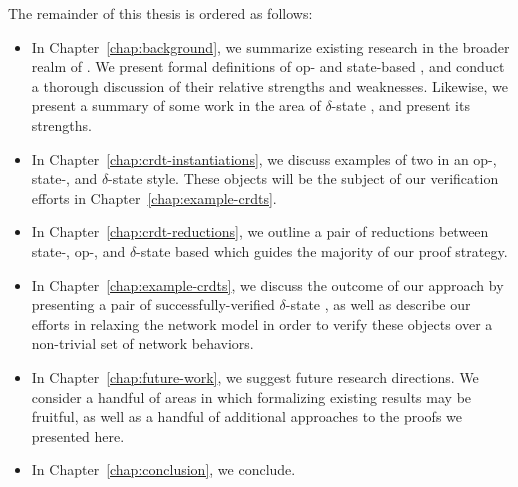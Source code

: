 The remainder of this thesis is ordered as follows:
\begin{itemize}
  \item In Chapter~\ref{chap:background}, we summarize existing research in the
    broader realm of \CRDTs. We present formal definitions of op- and
    state-based \CRDTs, and conduct a thorough discussion of their relative
    strengths and weaknesses. Likewise, we present a summary of some work in the
    area of $\delta$-state \CRDTs, and present its strengths.
  \item In Chapter~\ref{chap:crdt-instantiations}, we discuss examples of two
    \CRDTs in an op-, state-, and $\delta$-state style. These objects will be
    the subject of our verification efforts in Chapter~\ref{chap:example-crdts}.
  \item In Chapter~\ref{chap:crdt-reductions}, we outline a pair of reductions
    between state-, op-, and $\delta$-state based \CRDTs which guides the
    majority of our proof strategy.
  \item In Chapter~\ref{chap:example-crdts}, we discuss the outcome of our
    approach by presenting a pair of successfully-verified $\delta$-state
    \CRDTs, as well as describe our efforts in relaxing the network model in
    order to verify these objects over a non-trivial set of network behaviors.
  \item In Chapter~\ref{chap:future-work}, we suggest future
    research directions. We consider a handful of areas in which formalizing
    existing results may be fruitful, as well as a handful of additional
    approaches to the proofs we presented here.
  \item In Chapter~\ref{chap:conclusion}, we conclude.
\end{itemize}

